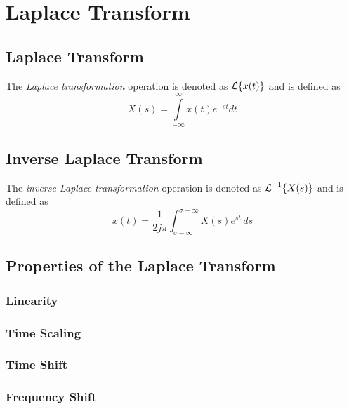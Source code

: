 \section{Laplace Transform}\label{app:Laplace_Transform}
\subsection{Laplace Transform}\label{subsec:Laplace_Transform}
\begin{definition}\label{def:Laplace_Transform}
  The \emph{Laplace transformation} operation is denoted as $\operatorname{\mathcal{L}} \lbrace x(t) \rbrace$ and is defined as
  \begin{equation}\label{eq:Laplace_Transform}
    X(s) = \int\limits_{-\infty}^{\infty} x(t) e^{-st} dt
  \end{equation}
\end{definition}

\subsection{Inverse Laplace Transform}\label{subsec:Inverse_Laplace_Transform}
\begin{definition}\label{def:Inverse_Laplace_Transform}
  The \emph{inverse Laplace transformation} operation is denoted as $\operatorname{\mathcal{L}}^{-1} \lbrace X(s) \rbrace$ and is defined as
  \begin{equation}\label{eq:Inverse_Laplace_Transform}
    x(t) = \frac{1}{2j \pi} \int_{\sigma-\infty}^{\sigma+\infty} X(s) e^{st} \, ds
  \end{equation}
\end{definition}

\subsection{Properties of the Laplace Transform}\label{subsec:Laplace_Transform_Properties}
\subsubsection{Linearity}\label{subsubsec:Laplace_Linearity}
\subsubsection{Time Scaling}\label{subsubsec:Laplace_Time_Scaling}
\subsubsection{Time Shift}\label{subsubsec:Laplace_Time_Shift}
\subsubsection{Frequency Shift}\label{subsubsec:Laplace_Frequency_Shift}

